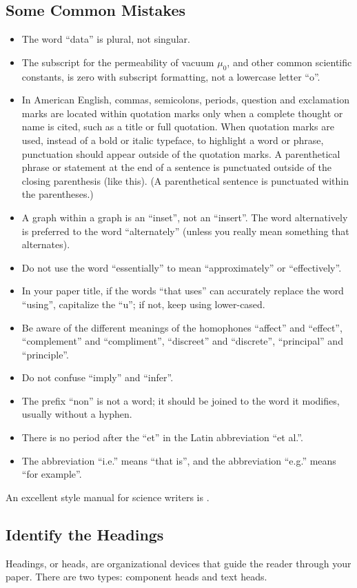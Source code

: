 \documentclass[conference]{IEEEtran}
\begin{document}
\subsection{Some Common Mistakes}\label{SCM}
\begin{itemize}
\item The word ``data'' is plural, not singular.
\item The subscript for the permeability of vacuum $\mu_{0}$, and other common scientific constants, is zero with subscript formatting, not a lowercase letter ``o''.
\item In American English, commas, semicolons, periods, question and exclamation marks are located within quotation marks only when a complete thought or name is cited, such as a title or full quotation. When quotation marks are used, instead of a bold or italic typeface, to highlight a word or phrase, punctuation should appear outside of the quotation marks. A parenthetical phrase or statement at the end of a sentence is punctuated outside of the closing parenthesis (like this). (A parenthetical sentence is punctuated within the parentheses.)
\item A graph within a graph is an ``inset'', not an ``insert''. The word alternatively is preferred to the word ``alternately'' (unless you really mean something that alternates).
\item Do not use the word ``essentially'' to mean ``approximately'' or ``effectively''.
\item In your paper title, if the words ``that uses'' can accurately replace the word ``using'', capitalize the ``u''; if not, keep using lower-cased.
\item Be aware of the different meanings of the homophones ``affect'' and ``effect'', ``complement'' and ``compliment'', ``discreet'' and ``discrete'', ``principal'' and ``principle''.
\item Do not confuse ``imply'' and ``infer''.
\item The prefix ``non'' is not a word; it should be joined to the word it modifies, usually without a hyphen.
\item There is no period after the ``et'' in the Latin abbreviation ``et al.''.
\item The abbreviation ``i.e.'' means ``that is'', and the abbreviation ``e.g.'' means ``for example''.
\end{itemize}
An excellent style manual for science writers is \cite{b7}.

\subsection{Identify the Headings}\label{ITH}
Headings, or heads, are organizational devices that guide the reader through 
your paper. There are two types: component heads and text heads.
\end{document}
